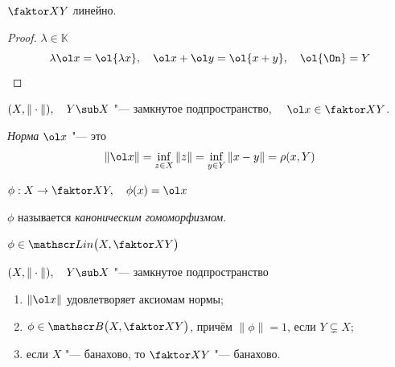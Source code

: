 \begin{remark}
	$ \faktor X Y $ линейно.
\end{remark}

\begin{proof}
	$ \lambda \in \mathbb K $
	$$ \lambda \ol x = \ol{\lambda x}, \quad \ol x + \ol y = \ol{x + y}, \quad \ol{\On} = Y $$
\end{proof}

\begin{definition}
	$ (X, \|\cdot\|), \quad Y \sub X $ "--- замкнутое подпространство, $ \quad
	\ol x \in \faktor X Y $.

	\emph{Норма} $ \ol x $ "--- это
	$$ \|\ol x\| = \inf\limits_{z \in X}\|z\| = \inf\limits_{y \in Y}\|x - y\| = \rho(x, Y) $$
\end{definition}

\begin{definition}
	$ \phi : X \to \faktor X Y, \quad \phi(x) = \ol x $

	$ \phi $ называется \emph{каноническим гомоморфизмом}.
\end{definition}

\begin{remark}
	$ \phi \in \mathscr Lin\bigl(X, \faktor X Y\bigr) $
\end{remark}

\begin{theorem}
	$ (X, \|\cdot\|), \quad Y \sub X $ "--- замкнутое подпространство
	\begin{enumerate}
		\item $ \|\ol x\| $ удовлетворяет аксиомам нормы;
		\item $ \phi \in \mathscr B \bigl( X, \faktor X Y \bigr) $,
			причём $ \|\phi\| = 1 $, если $ Y \subsetneq X $;
		\item если $ X $ "--- банахово, то $ \faktor X Y $ "--- банахово.
	\end{enumerate}
\end{theorem}

